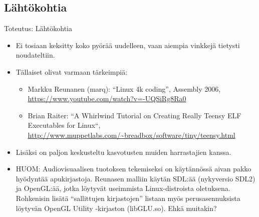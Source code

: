 \documentclass[pdf,10pt]{beamer}
\begin{document}
\subsection{Lähtökohtia}
\begin{frame}{Toteutus: Lähtökohtia}
\begin{itemize}
\item
Ei tosiaan keksitty koko pyörää uudelleen, vaan aiempia vinkkejä
tietysti noudateltiin.
\item Tällaiset olivat varmaan tärkeimpiä:
  \begin{itemize}
    \item Markku Reunanen (marq): ``Linux 4k coding'', Assembly 2006,
      \url{https://www.youtube.com/watch?v=-UQSiRg8Ra0}
    \item Brian Raiter: ``A Whirlwind Tutorial on Creating Really
      Teensy ELF Executables for Linux``, 
      \url{http://www.muppetlabs.com/~breadbox/software/tiny/teensy.html}
  \end{itemize}
\item
   Lisäksi on paljon keskusteltu kasvotusten muiden harrastajien
   kanssa.
\item
HUOM: Audiovisuaalisen tuotoksen tekemiseksi on käytännössä aivan
pakko hyödyntää apukirjastoja. Reunasen malliin käytän SDL:ää
(nykyversio SDL2) ja OpenGL:ää, jotka löytyvät useimmista
Linux-distroista oletuksena. Rohkenisin lisätä ``sallittujen
kirjastojen'' listaan myös perusasennuksista löytyvän OpenGL Utility
-kirjaston (libGLU.so). Ehkä muitakin?
\end{itemize}
\end{frame}
\end{document}

